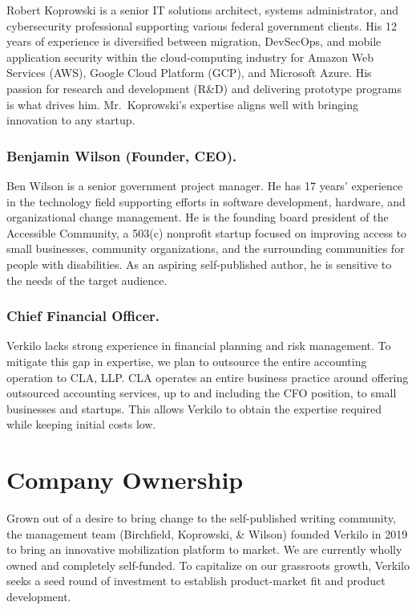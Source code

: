 \documentclass[10pt,openany]{book}
\begin{document}
Robert Koprowski is a senior IT solutions architect, systems
administrator, and cybersecurity professional supporting various federal
government clients. His 12 years of experience is diversified between
migration, DevSecOps, and mobile application security within the
cloud-computing industry for Amazon Web Services (AWS), Google Cloud
Platform (GCP), and Microsoft Azure. His passion for research and
development (R\&D) and delivering prototype programs is what drives him.
Mr.~Koprowski's expertise aligns well with bringing innovation to any
startup.

\hypertarget{benjamin-wilson-founder-ceo.}{%
\subsubsection{Benjamin Wilson (Founder,
CEO).}\label{benjamin-wilson-founder-ceo.}}

Ben Wilson is a senior government project manager. He has 17 years'
experience in the technology field supporting efforts in software
development, hardware, and organizational change management. He is the
founding board president of the Accessible Community, a 503(c) nonprofit
startup focused on improving access to small businesses, community
organizations, and the surrounding communities for people with
disabilities. As an aspiring self-published author, he is sensitive to
the needs of the target audience.

\hypertarget{chief-financial-officer.}{%
\subsubsection{Chief Financial
Officer.}\label{chief-financial-officer.}}

Verkilo lacks strong experience in financial planning and risk
management. To mitigate this gap in expertise, we plan to outsource the
entire accounting operation to CLA, LLP. CLA operates an entire business
practice around offering outsourced accounting services, up to and
including the CFO position, to small businesses and startups. This
allows Verkilo to obtain the expertise required while keeping initial
costs low.

\hypertarget{company-ownership}{%
\section{Company Ownership}\label{company-ownership}}

Grown out of a desire to bring change to the self-published writing
community, the management team (Birchfield, Koprowski, \& Wilson)
founded Verkilo in 2019 to bring an innovative mobilization platform to
market. We are currently wholly owned and completely self-funded. To
capitalize on our grassroots growth, Verkilo seeks a seed round of
investment to establish product-market fit and product development.
\end{document}
